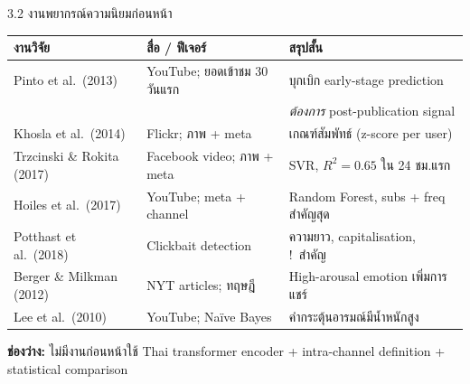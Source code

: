 \documentclass[aspectratio=169,11pt,xcolor=dvipsnames]{beamer}
\newcommand{\hl}[1]{\textcolor{kmitlOrange}{\textbf{#1}}}
\begin{document}
\begin{frame}{3.2 งานพยากรณ์ความนิยมก่อนหน้า}
  \footnotesize
  \begin{tabular}{p{3.2cm}p{3.3cm}p{6.5cm}}
    \toprule
    \textbf{งานวิจัย} & \textbf{สื่อ / ฟีเจอร์} & \textbf{สรุปสั้น} \\
    \midrule
    Pinto et al.\ (2013) & YouTube; ยอดเข้าชม 30 วันแรก & บุกเบิก early-stage prediction\\
                        &                          & \emph{ต้องการ} post-publication signal\\[0.3em]
    Khosla et al.\ (2014) & Flickr; ภาพ + meta & เกณฑ์สัมพัทธ์ (z-score per user)\\[0.3em]
    Trzcinski \& Rokita (2017) & Facebook video; ภาพ + meta & SVR, $R^2 = 0.65$ ใน 24 ชม.แรก\\[0.3em]
    Hoiles et al.\ (2017) & YouTube; meta + channel & Random Forest, subs + freq สำคัญสุด\\[0.3em]
    Potthast et al.\ (2018) & Clickbait detection & ความยาว, capitalisation, !\ สำคัญ\\[0.3em]
    Berger \& Milkman (2012) & NYT articles; ทฤษฎี & High-arousal emotion เพิ่มการแชร์\\[0.3em]
    Lee et al.\ (2010) & YouTube; Na\"ive Bayes & คำกระตุ้นอารมณ์มีน้ำหนักสูง\\
    \bottomrule
  \end{tabular}
  \vspace{0.5em}
  \begin{center}
    \hl{ช่องว่าง:} ไม่มีงานก่อนหน้าใช้ Thai transformer encoder + intra-channel definition + statistical comparison
  \end{center}
\end{frame}
\end{document}
